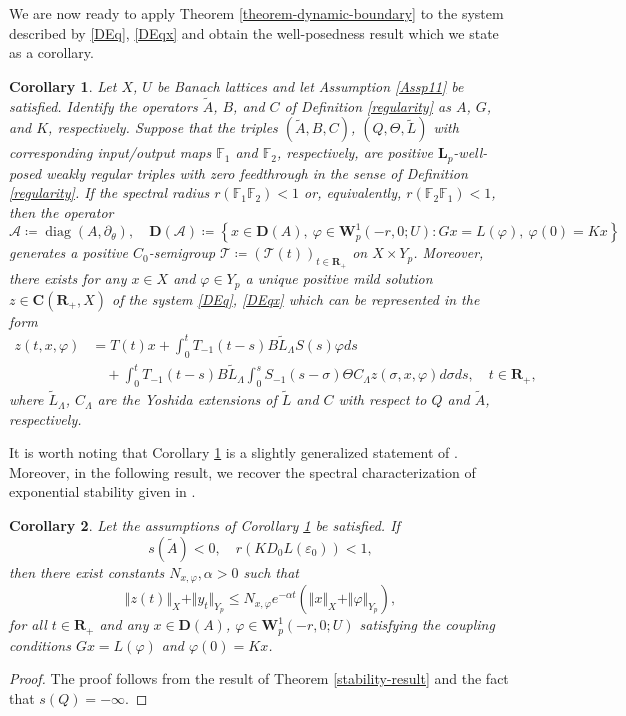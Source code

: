 \documentclass[a4paper,11pt,reqno]{amsart}
\def\calT{{\mathcal{T}}}
\def\calA{{\mathcal{A}}}
\def\R{\mathbf{R}}
\def\F{\mathbb F}
\theoremstyle{plain}
\newtheorem{corollary}{Corollary}[section]
\numberwithin{equation}{section}
\begin{document}
We are now ready to apply Theorem \ref{theorem-dynamic-boundary} to the system described by \eqref{DEq}, \eqref{DEqx} and obtain the well-posedness result which we state as a corollary.
\begin{corollary}\label{Cor1}
Let $X$, $U$ be Banach lattices and let Assumption \ref{Assp11} be satisfied. Identify the operators $\tilde{A}$, $B$, and $C$ of Definition \ref{regularity} as $A$, $G$, and $K$, respectively. Suppose that the triples $(\tilde{A},B, C)$, $(Q,\Theta,\tilde{L})$ with corresponding input/output maps $\F_{1}$ and $\F_2$, respectively, are positive $\bm{L}_p$-well-posed weakly regular triples with zero feedthrough in the sense of Definition \ref{regularity}. If the spectral radius $r(\F_1\F_2)<1$ or, equivalently, $r(\F_2\F_1)<1$, then the operator 
\begin{equation}\label{A-delay}
\calA\coloneqq\operatorname{diag}(A, \partial_\theta),\quad {\bm D}(\calA)\coloneqq \left\{x\in {\bm D}(A),~\varphi\in \bm{W}^{1}_p(-r,0;U): Gx=L(\varphi),~\varphi(0)=Kx\right\}
\end{equation}
generates a positive $C_0$-semigroup $\calT\coloneqq (\calT(t))_{t\in\R_+}$ on $X\times Y_p$. Moreover, there exists for any $x\in X$ and $\varphi\in Y_p$ a unique positive mild solution $z\in \bm{C}(\R_+,X)$ of the system \eqref{DEq}, \eqref{DEqx} which can be represented in the form
\begin{align*}
z(t,x,\varphi)&=T(t)x+ \int_{0}^{t}T_{-1}(t-s)B\tilde{L}_{\Lambda} S(s)\varphi ds
\\&\quad+ \int_{0}^{t}T_{-1}(t-s)B\tilde{L}_{\Lambda} \int_{0}^{s}S_{-1}(s-\sigma)\Theta C_\Lambda z(\sigma,x,\varphi)d\sigma ds,\quad t\in\R_+,
\end{align*}
where $\tilde{L}_{\Lambda}$, $C_\Lambda$ are the Yoshida extensions of $\tilde{L}$ and $C$ with respect to $Q$ and $\tilde{A}$, respectively. 
\end{corollary}

It is worth noting that Corollary \ref{Cor1} is a slightly generalized statement of \cite[Theorem 4.1]{GANTOUH2026106307}. Moreover, in the following result, we recover the spectral characterization of exponential stability given in \cite[Theorem 4.2]{GANTOUH2026106307}.
\begin{corollary}
Let the assumptions of Corollary \ref{Cor1} be satisfied. If 
\begin{equation*}
s(\tilde{A})<0,\quad r\left(KD_0L(\varepsilon_0)\right)<1,
\end{equation*}
then there exist constants $N_{x,\varphi}, \alpha>0$ such that
\begin{equation*}
\Vert z(t)\Vert_{X}+\Vert y_t\Vert_{Y_p}\le N_{x,\varphi} e^{-\alpha t}\left(\Vert x\Vert_{X}+\Vert\varphi\Vert_{Y_p}\right),
\end{equation*}
for all $t\in\R_+$ and any $x\in {\bm D}(A)$, $\varphi\in \bm{W}^{1}_p(-r,0;U)$ satisfying the coupling conditions $Gx=L(\varphi)$ and $ \varphi(0)=Kx$.
\end{corollary}
\begin{proof}
The proof follows from the result of Theorem \ref{stability-result} and the fact that $s(Q)=-\infty$.
\end{proof}
\end{document}
